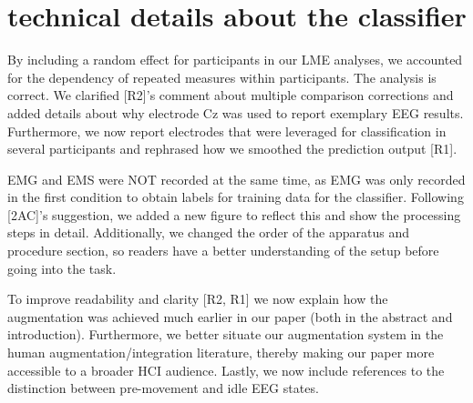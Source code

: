 \section{technical details about the classifier}

By including a random effect for participants in our LME analyses, we accounted for the dependency of repeated measures within participants. The analysis is correct. We clarified [R2]'s comment about multiple comparison corrections and added details about why electrode Cz was used to report exemplary EEG results. Furthermore, we now report electrodes that were leveraged for classification in several participants and rephrased how we smoothed the prediction output [R1].

EMG and EMS were NOT recorded at the same time, as EMG was only recorded in the first condition to obtain labels for training data for the classifier. Following [2AC]'s suggestion, we added a new figure to reflect this and show the processing steps in detail. Additionally, we changed the order of the apparatus and procedure section, so readers have a better understanding of the setup before going into the task. 

To improve readability and clarity [R2, R1] we now explain how the augmentation was achieved much earlier in our paper (both in the abstract and introduction). Furthermore, we better situate our augmentation system in the human augmentation/integration literature, thereby making our paper more accessible to a broader HCI audience. Lastly, we now include references to the distinction between pre-movement and idle EEG states.

